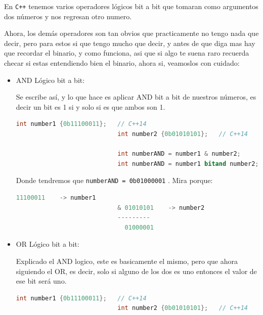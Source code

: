\documentclass[12pt, fleqn]{report}                             %
\theoremstyle{break}                                            %
\newcommand{\textCode}[1]  { \texttt{#1} }                      %
\newcommand{\Cpp}{\ignorespaces\textCode{C++}}                  %
\begin{document}
                En \Cpp tenemos varios operadores lógicos bit a bit que tomaran como argumentos dos números 
                y nos regresan otro numero.

                Ahora, los demás operadores son tan obvios que practicamente no tengo nada que decir, pero para estos si que tengo
                mucho que decir, y antes de que diga mas hay que recordar el binario, y como funciona, 
                asi que si algo te suena raro recuerda checar si estas entendiendo bien el binario, ahora si, 
                veamoslos con cuidado:

                \begin{itemize}
                    \item AND Lógico bit a bit: 
                    
                        Se escribe así, y lo que hace es aplicar AND bit a bit de nuestros números, es decir
                        un bit es 1 si y solo si es que ambos son 1.
                        \begin{lstlisting}[language=C++, gobble=28]
                            int number1 {0b11100011};   // C++14
                            int number2 {0b01010101};   // C++14

                            int numberAND = number1 & number2;
                            int numberAND = number1 bitand number2;
                        \end{lstlisting}

                        Donde tendremos que \textCode{numberAND = 0b01000001}. Mira porque:
                        \begin{lstlisting}[language=C++, gobble=28]
                              11100011    -> number1
                            & 01010101    -> number2
                            ---------
                              01000001
                        \end{lstlisting}
                        
                    \item OR Lógico bit a bit: 
                    
                        Explicado el AND logico, este es basicamente el mismo, pero que ahora siguiendo el OR, es
                        decir, solo si alguno de los dos es uno entonces el valor de ese bit será uno.
                        \begin{lstlisting}[language=C++, gobble=28]
                            int number1 {0b11100011};   // C++14
                            int number2 {0b01010101};   // C++14


\end{lstlisting}
\end{itemize}
\end{document}
